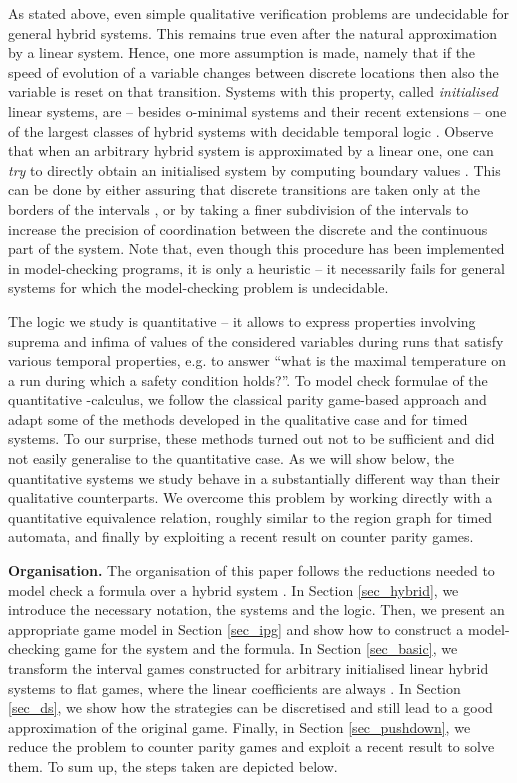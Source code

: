 \documentclass[fleqn,envcountsame]{LMCS}
\newcommand{\eg}{e.g.\xspace}
\begin{document}
As stated above, even simple
qualitative verification problems are undecidable for general hybrid systems.
This remains true even after the natural approximation by a linear system.
Hence, one more assumption is made, namely that if the speed of evolution of a
variable changes between discrete locations then also the variable is reset
on that transition. Systems with this property, called \emph{initialised}
linear systems, are -- besides o-minimal systems \cite{LPS00,BBC07} and their
recent extensions \cite{VPVD08} -- one of the largest classes of hybrid systems
with decidable temporal logic \cite{HKPV95}.
Observe that when an arbitrary hybrid system is approximated by a linear one,
one can \emph{try} to directly obtain an initialised system by computing
boundary values \cite{HHW96}. This can be done by either assuring that discrete
transitions are taken only at the borders of the intervals , or by taking
a finer subdivision of the intervals to increase the precision of coordination
between the discrete and the continuous part of the system. Note that, even
though this procedure has been implemented in model-checking programs, it is
only a heuristic -- it necessarily fails for general systems for which the
model-checking problem is undecidable.

The logic we study is quantitative -- it allows to express properties involving
suprema and infima of values of the considered variables during runs that
satisfy various temporal properties, \eg to answer
``what is the maximal temperature on a run during which a safety condition
holds?''. To model check formulae of the quantitative -calculus,
we follow the classical parity game-based approach
and adapt some of the methods developed in the qualitative
case and for timed systems. To our surprise, these methods turned out
not to be sufficient and did not easily generalise to
the quantitative case. As we will show below, the quantitative systems we study
behave in a substantially different way than their qualitative counterparts.
We overcome this problem by working directly with a quantitative
equivalence relation, roughly similar to the region graph for timed automata,
and finally by exploiting a recent result on counter parity games.

\textbf{Organisation.}
The organisation of this paper follows the reductions needed to model check
a formula  over a hybrid system . 
In Section \ref{sec_hybrid}, we introduce the necessary notation,
the systems and the logic. Then, we present
an appropriate game model in Section \ref{sec_ipg} and show how to 
construct a model-checking game  for the system and the formula.
In Section \ref{sec_basic}, we transform the interval games constructed for
arbitrary initialised linear hybrid systems to flat games, where the linear
coefficients are always . In Section \ref{sec_ds}, we show how the strategies
can be discretised and still lead to a good approximation of the original game.
Finally, in Section \ref{sec_pushdown}, we reduce the problem to counter
parity games and exploit a recent result to solve them.
To sum up, the steps taken are depicted below.
\end{document}
